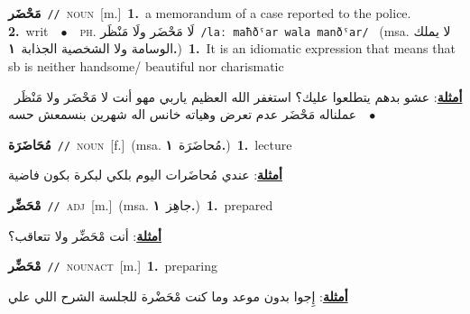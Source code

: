 \documentclass[10pt,a4paper,twoside]{article} %
\begin{document}
\begin{multicols}{2}
{\setlength\topsep{0pt}\textbf{\foreignlanguage{arabic}{مَحْضَر}}\ {\color{gray}\texttt{//}\color{black}}\ \textsc{noun}\ [m.]\ \textbf{1.}~a memorandum of a case reported to the police.  \textbf{2.}~writ\ \ $\bullet$\ \ \textsc{ph.} \color{gray} \foreignlanguage{arabic}{لَا مَحْضَر ولَا مَنْظَر}\color{black}\ {\color{gray}\texttt{/{\sffamily laː maħðˤar wala manðˤar}/}\color{black}}\ \color{gray} (msa. \foreignlanguage{arabic}{لا يملك الوسامة ولا الشخصية الجذابة}~\foreignlanguage{arabic}{\textbf{١.}})\color{black}\ \textbf{1.}~It is an idiomatic expression that means that sb is neither handsome/ beautiful nor charismatic\  \begin{flushright}\color{gray}\foreignlanguage{arabic}{\textbf{\underline{\foreignlanguage{arabic}{أمثلة}}}: عشو بدهم يتطلعوا عليك؟ استغفر الله العظيم ياربي مهو أنت لا مَحْضَر ولا مَنْظَر\ $\bullet$\ \  عملناله مَحْضَر عدم تعرض وهياته خانس اله شهرين بنسمعش حسه}\end{flushright}\color{black}} \vspace{2mm}

{\setlength\topsep{0pt}\textbf{\foreignlanguage{arabic}{مُحَاضَرَة}}\ {\color{gray}\texttt{//}\color{black}}\ \textsc{noun}\ [f.]\ \color{gray}(msa. \foreignlanguage{arabic}{مُحاضَرَة}~\foreignlanguage{arabic}{\textbf{١.}})\color{black}\ \textbf{1.}~lecture\  \begin{flushright}\color{gray}\foreignlanguage{arabic}{\textbf{\underline{\foreignlanguage{arabic}{أمثلة}}}: عندي مُحاضَرات اليوم بلكي لبكرة بكون فاضية}\end{flushright}\color{black}} \vspace{2mm}

{\setlength\topsep{0pt}\textbf{\foreignlanguage{arabic}{مْحَضِّر}}\ {\color{gray}\texttt{//}\color{black}}\ \textsc{adj}\ [m.]\ \color{gray}(msa. \foreignlanguage{arabic}{جاهِز}~\foreignlanguage{arabic}{\textbf{١.}})\color{black}\ \textbf{1.}~prepared\  \begin{flushright}\color{gray}\foreignlanguage{arabic}{\textbf{\underline{\foreignlanguage{arabic}{أمثلة}}}: أنت مْحَضِّر ولا تتعاقب؟}\end{flushright}\color{black}} \vspace{2mm}

{\setlength\topsep{0pt}\textbf{\foreignlanguage{arabic}{مْحَضِّر}}\ {\color{gray}\texttt{//}\color{black}}\ \textsc{noun\textunderscore act}\ [m.]\ \textbf{1.}~preparing\  \begin{flushright}\color{gray}\foreignlanguage{arabic}{\textbf{\underline{\foreignlanguage{arabic}{أمثلة}}}: إِجوا بدون موعد وما كنت مْحَضْرة للجلسة الشرح اللي علي}\end{flushright}\color{black}} \vspace{2mm}


\end{multicols}
\end{document}
